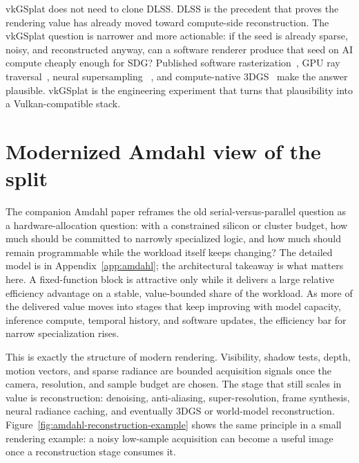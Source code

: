 \documentclass[10pt,journal]{IEEEtran}
\begin{document}
vkGSplat does not need to clone DLSS. DLSS is the precedent that proves
the rendering value has already moved toward compute-side
reconstruction. The vkGSplat question is narrower and more actionable:
if the seed is already sparse, noisy, and reconstructed anyway, can a
software renderer produce that seed on AI compute cheaply enough for
SDG? Published software rasterization~\cite{laine2011software}, GPU ray
traversal~\cite{aila2009understanding}, neural supersampling
~\cite{xiao2020}, and compute-native 3DGS~\cite{kerbl20233dgs} make the
answer plausible. vkGSplat is the engineering experiment that turns that
plausibility into a Vulkan-compatible stack.

\section{Modernized Amdahl view of the split}
\label{sec:amdahl-main}

The companion Amdahl paper reframes the old serial-versus-parallel
question as a hardware-allocation question: with a constrained silicon
or cluster budget, how much should be committed to narrowly specialized
logic, and how much should remain programmable while the workload itself
keeps changing?  The detailed model is in
Appendix~\ref{app:amdahl}; the architectural takeaway is what matters
here.  A fixed-function block is attractive only while it delivers a
large relative efficiency advantage on a stable, value-bounded share of
the workload.  As more of the delivered value moves into stages that
keep improving with model capacity, inference compute, temporal history,
and software updates, the efficiency bar for narrow specialization rises.

This is exactly the structure of modern rendering.  Visibility, shadow
tests, depth, motion vectors, and sparse radiance are bounded acquisition
signals once the camera, resolution, and sample budget are chosen.  The
stage that still scales in value is reconstruction: denoising,
anti-aliasing, super-resolution, frame synthesis, neural radiance
caching, and eventually 3DGS or world-model reconstruction.
Figure~\ref{fig:amdahl-reconstruction-example} shows the same principle in a
small rendering example: a noisy low-sample acquisition can become a
useful image once a reconstruction stage consumes it.
\end{document}
